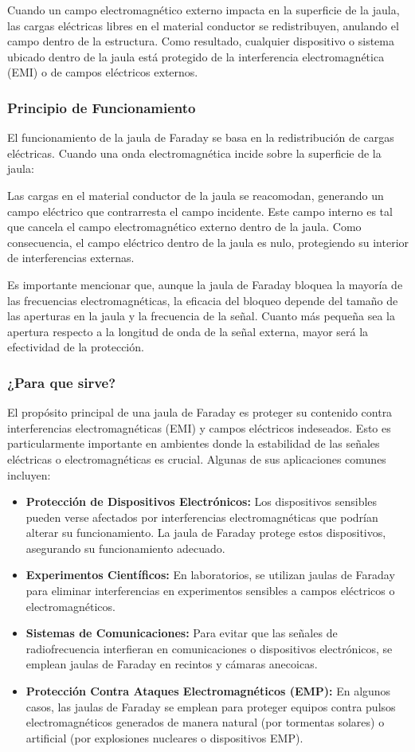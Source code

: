 \documentclass{article}
\begin{document}
Cuando un campo electromagnético externo impacta en la superficie de la jaula, las cargas eléctricas libres en el material conductor se redistribuyen, anulando el campo dentro de la estructura. Como resultado, cualquier dispositivo o sistema ubicado dentro de la jaula está protegido de la interferencia electromagnética (EMI) o de campos eléctricos externos.

\subsubsection{Principio de Funcionamiento}
El funcionamiento de la jaula de Faraday se basa en la redistribución de cargas eléctricas. Cuando una onda electromagnética incide sobre la superficie de la jaula:

    Las cargas en el material conductor de la jaula se reacomodan, generando un campo eléctrico que contrarresta el campo incidente. Este campo interno es tal que cancela el campo electromagnético externo dentro de la jaula. Como consecuencia, el campo eléctrico dentro de la jaula es nulo, protegiendo su interior de interferencias externas.

Es importante mencionar que, aunque la jaula de Faraday bloquea la mayoría de las frecuencias electromagnéticas, la eficacia del bloqueo depende del tamaño de las aperturas en la jaula y la frecuencia de la señal. Cuanto más pequeña sea la apertura respecto a la longitud de onda de la señal externa, mayor será la efectividad de la protección.

\subsubsection{¿Para que sirve?}
El propósito principal de una jaula de Faraday es proteger su contenido contra interferencias electromagnéticas (EMI) y campos eléctricos indeseados. Esto es particularmente importante en ambientes donde la estabilidad de las señales eléctricas o electromagnéticas es crucial. Algunas de sus aplicaciones comunes incluyen:
\begin{itemize}
    \item \textbf{Protección de Dispositivos Electrónicos:} Los dispositivos sensibles pueden verse afectados por interferencias electromagnéticas que podrían alterar su funcionamiento. La jaula de Faraday protege estos dispositivos, asegurando su funcionamiento adecuado.
    \item \textbf{Experimentos Científicos:} En laboratorios, se utilizan jaulas de Faraday para eliminar interferencias en experimentos sensibles a campos eléctricos o electromagnéticos.
    \item \textbf{Sistemas de Comunicaciones:} Para evitar que las señales de radiofrecuencia interfieran en comunicaciones o dispositivos electrónicos, se emplean jaulas de Faraday en recintos y cámaras anecoicas.
    \item \textbf{Protección Contra Ataques Electromagnéticos (EMP):} En algunos casos, las jaulas de Faraday se emplean para proteger equipos contra pulsos electromagnéticos generados de manera natural (por tormentas solares) o artificial (por explosiones nucleares o dispositivos EMP).
\end{itemize}
\end{document}
